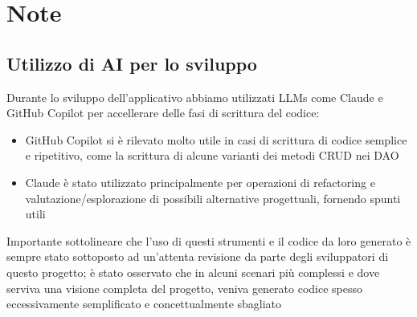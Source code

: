 \section{Note}
\subsection{Utilizzo di AI per lo sviluppo}
Durante lo sviluppo dell'applicativo abbiamo utilizzati LLMs come Claude e GitHub Copilot per accellerare delle fasi di scrittura del codice:
\begin{itemize}
    \item GitHub Copilot si è rilevato molto utile in casi di scrittura di codice semplice e ripetitivo, come la scrittura di alcune varianti dei metodi CRUD nei DAO
    \item Claude è stato utilizzato principalmente per operazioni di refactoring e valutazione/esplorazione di possibili alternative progettuali, fornendo spunti utili
\end{itemize}
Importante sottolineare che l'uso di questi strumenti e il codice da loro generato è sempre stato sottoposto ad un'attenta revisione da parte degli sviluppatori di questo progetto; è stato osservato che in alcuni scenari più complessi e dove serviva una visione completa del progetto, veniva generato codice spesso eccessivamente semplificato e concettualmente sbagliato
